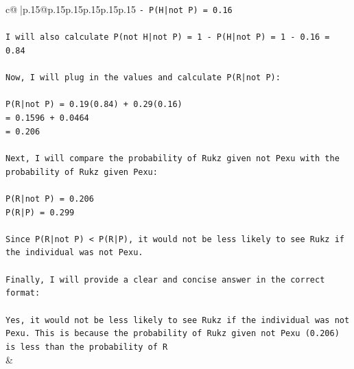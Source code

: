 \documentclass{article}
\begin{document}
{\begin{supertabular}{c@{$\;$}|p{.15\linewidth}@{}p{.15\linewidth}p{.15\linewidth}p{.15\linewidth}p{.15\linewidth}p{.15\linewidth}}
{{{\texttt{{-} P(H|not P) = 0.16} \\
\\ 
\texttt{I will also calculate P(not H|not P) = 1 {-} P(H|not P) = 1 {-} 0.16 = 0.84} \\
\\ 
\texttt{Now, I will plug in the values and calculate P(R|not P):} \\
\\ 
\texttt{P(R|not P) = 0.19(0.84) + 0.29(0.16)} \\
\texttt{= 0.1596 + 0.0464} \\
\texttt{= 0.206} \\
\\ 
\texttt{Next, I will compare the probability of Rukz given not Pexu with the probability of Rukz given Pexu:} \\
\\ 
\texttt{P(R|not P) = 0.206} \\
\texttt{P(R|P) = 0.299} \\
\\ 
\texttt{Since P(R|not P) < P(R|P), it would not be less likely to see Rukz if the individual was not Pexu.} \\
\\ 
\texttt{Finally, I will provide a clear and concise answer in the correct format:} \\
\\ 
\texttt{Yes, it would not be less likely to see Rukz if the individual was not Pexu. This is because the probability of Rukz given not Pexu (0.206) is less than the probability of R} \\
            }
        }
    }
    & \\ \\

\end{supertabular}
}
\end{document}
